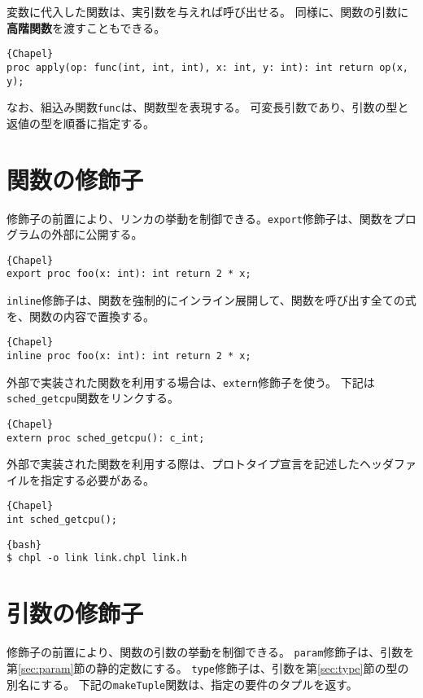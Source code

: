 \documentclass[10pt,a4paper]{book}
\begin{document}
変数に代入した関数は、実引数を与えれば呼び出せる。
同様に、関数の引数に\textbf{高階関数}を渡すこともできる。

\begin{Verbatim}{Chapel}
proc apply(op: func(int, int, int), x: int, y: int): int return op(x, y);
\end{Verbatim}

なお、組込み関数\verb#func#は、関数型を表現する。
可変長引数であり、引数の型と返値の型を順番に指定する。

\section{関数の修飾子}

修飾子の前置により、リンカの挙動を制御できる。\verb#export#修飾子は、関数をプログラムの外部に公開する。

\begin{Verbatim}{Chapel}
export proc foo(x: int): int return 2 * x;
\end{Verbatim}

\verb#inline#修飾子は、関数を強制的にインライン展開して、関数を呼び出す全ての式を、関数の内容で置換する。

\begin{Verbatim}{Chapel}
inline proc foo(x: int): int return 2 * x;
\end{Verbatim}

外部で実装された関数を利用する場合は、\verb#extern#修飾子を使う。
下記は\verb#sched_getcpu#関数をリンクする。

\begin{Verbatim}{Chapel}
extern proc sched_getcpu(): c_int;
\end{Verbatim}

外部で実装された関数を利用する際は、プロトタイプ宣言を記述したヘッダファイルを指定する必要がある。

\begin{Verbatim}{Chapel}
int sched_getcpu();
\end{Verbatim}

\begin{Verbatim}{bash}
$ chpl -o link link.chpl link.h
\end{Verbatim}

\section{引数の修飾子}

修飾子の前置により、関数の引数の挙動を制御できる。
\verb#param#修飾子は、引数を第\ref{sec:param}節の静的定数にする。
\verb#type#修飾子は、引数を第\ref{sec:type}節の型の別名にする。
下記の\verb#makeTuple#関数は、指定の要件のタプルを返す。
\end{document}
